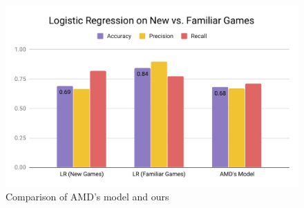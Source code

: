 \begin{figure}
    \centering
    \includegraphics[scale=0.7]{images/comparison.pdf}
    \caption{Comparison of AMD's model and ours}
    \label{fig:comparison}
\end{figure}
\endinput
